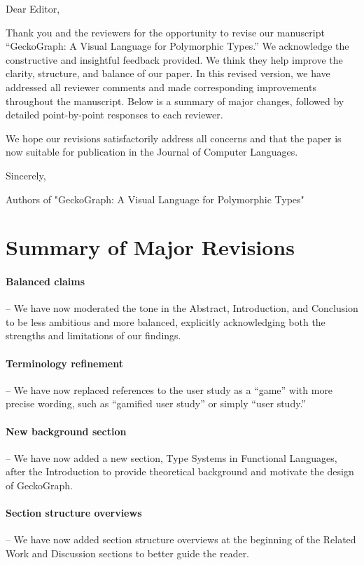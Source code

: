 \documentclass{article}
\begin{document}
Dear Editor,

Thank you and the reviewers for the opportunity to revise our manuscript “GeckoGraph: A Visual Language for Polymorphic Types.”
We acknowledge the constructive and insightful feedback provided. We think they help improve the clarity, structure, and balance of our paper.
In this revised version, we have addressed all reviewer comments and made corresponding improvements throughout the manuscript. Below is a summary of major changes, followed by detailed point-by-point responses to each reviewer.

We hope our revisions satisfactorily address all concerns and that the paper is now suitable for publication in the Journal of Computer Languages.

Sincerely,

Authors of "GeckoGraph: A Visual Language for Polymorphic Types"

\section{Summary of Major Revisions}

\paragraph{Balanced claims} – We have now moderated the tone in the Abstract, Introduction, and Conclusion to be less ambitious and more balanced, explicitly acknowledging both the strengths and limitations of our findings.

\paragraph{Terminology refinement} – We have now replaced references to the user study as a “game” with more precise wording, such as “gamified user study” or simply “user study.”

\paragraph{New background section} – We have now added a new section, Type Systems in Functional Languages, after the Introduction to provide theoretical background and motivate the design of GeckoGraph.

\paragraph{Section structure overviews} – We have now added section structure overviews at the beginning of the Related Work and Discussion sections to better guide the reader.
\end{document}
